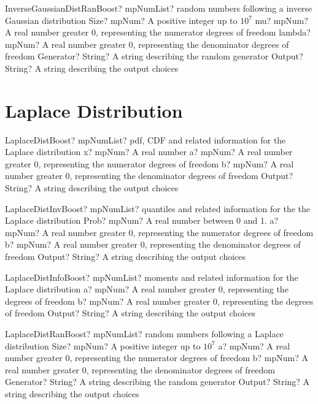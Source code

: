 \documentclass[12pt,a4paper,openany]{book}
\begin{document}
\begin{mpFunctionsExtract}
\mpFunctionFiveNotImplemented
{InverseGaussianDistRanBoost? mpNumList? random numbers following a inverse Gaussian distribution}
{Size? mpNum? A positive integer up to $10^7$}
{mu? mpNum? A real number greater 0, representing the numerator  degrees of freedom}
{lambda? mpNum? A real number greater 0, representing the denominator degrees of freedom}
{Generator? String? A string describing the random generator}
{Output? String? A string describing the output choices}
\end{mpFunctionsExtract}

\section{Laplace Distribution}

\begin{mpFunctionsExtract}
\mpFunctionFourNotImplemented
{LaplaceDistBoost? mpNumList? pdf, CDF and related information for the Laplace distribution}
{x? mpNum? A real number}
{a? mpNum? A real number greater 0, representing the numerator  degrees of freedom}
{b? mpNum? A real number greater 0, representing the denominator degrees of freedom}
{Output? String? A string describing the output choices}
\end{mpFunctionsExtract}

\begin{mpFunctionsExtract}
\mpFunctionFourNotImplemented
{LaplaceDistInvBoost? mpNumList? quantiles and related information for the the Laplace distribution}
{Prob? mpNum? A real number between 0 and 1.}
{a? mpNum? A real number greater 0, representing the numerator  degrees of freedom}
{b? mpNum? A real number greater 0, representing the denominator degrees of freedom}
{Output? String? A string describing the output choices}
\end{mpFunctionsExtract}

\begin{mpFunctionsExtract}
\mpFunctionThreeNotImplemented
{LaplaceDistInfoBoost? mpNumList? moments and related information for the Laplace distribution}
{a? mpNum? A real number greater 0, representing the degrees of freedom}
{b? mpNum? A real number greater 0, representing the degrees of freedom}
{Output? String? A string describing the output choices}
\end{mpFunctionsExtract}

\begin{mpFunctionsExtract}
\mpFunctionFiveNotImplemented
{LaplaceDistRanBoost? mpNumList? random numbers following a Laplace distribution}
{Size? mpNum? A positive integer up to $10^7$}
{a? mpNum? A real number greater 0, representing the numerator  degrees of freedom}
{b? mpNum? A real number greater 0, representing the denominator degrees of freedom}
{Generator? String? A string describing the random generator}
{Output? String? A string describing the output choices}
\end{mpFunctionsExtract}
\end{document}
